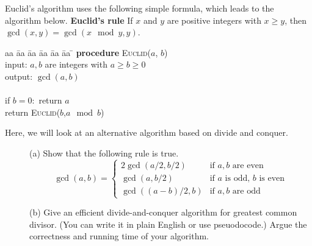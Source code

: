 \documentclass{article}
\begin{document}
\begin{problem} %
Euclid's algorithm uses the following simple formula, which leads to the algorithm below. 
\vskip 0.2in
\noindent \textbf{Euclid's rule} If $x$ and $y$ are positive integers with $x \ge y$, then $\gcd(x,y) = \gcd(x \mod y,y)$.

\begin{tabbing}
aa \= aa \= aa \= aa \= aa \= aa \= \kill
\textbf{procedure} \textsc{Euclid}($a$, $b$) \\
input: $a,b$ are integers with $a \ge b \ge 0$\\
output: $\gcd(a, b)$\\\\
if $b=0:$ return $a$\\
return \textsc{Euclid}($b$,$a \mod b$)
\end{tabbing}
Here, we will look at an alternative algorithm based on divide and conquer.
\begin{description}
\item[]{(a)} Show that the following rule is true. 
$$\gcd(a, b) = \begin{cases}
2\gcd(a/2,b/2) & \text{if $a,b$ are even} \\
\gcd(a,b/2) & \text{if $a$ is odd, $b$ is even} \\
\gcd((a-b)/2,b) & \text{if $a,b$ are odd}
\end{cases}$$
\item[]{(b)} Give an efficient divide-and-conquer algorithm for greatest common divisor. (You can write it in plain English or use pseuodocode.) Argue the correctness and running time of your algorithm.
\end{description}
\end{problem}
\end{document}
